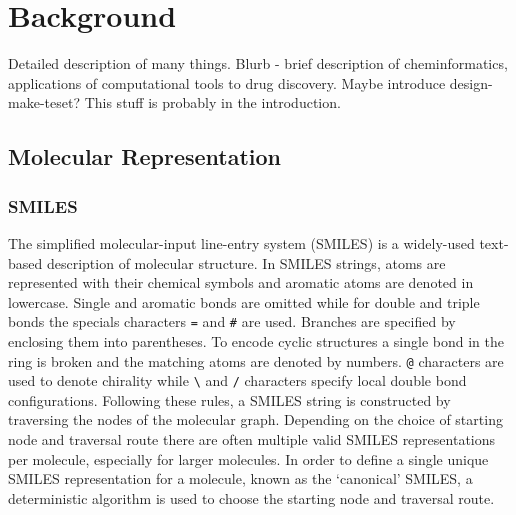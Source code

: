 \chapter{Background} \label{ch:background}

Detailed description of many things. Blurb - brief description of cheminformatics, applications of computational tools to drug discovery. Maybe introduce design-make-teset? This stuff is probably in the introduction.

\section{Molecular Representation}

\subsection{SMILES}
The simplified molecular-input line-entry system (SMILES) \cite{Weininger1988, Weininger1989} is a widely-used text-based description of molecular structure. In SMILES strings, atoms are represented with their chemical symbols and aromatic atoms are denoted in lowercase. Single and aromatic bonds are omitted while for double and triple bonds the specials characters \texttt{=} and \texttt{\#} are used. Branches are specified by enclosing them into parentheses. To encode cyclic structures a single bond in the ring is broken and the matching atoms are denoted by numbers. \texttt{@} characters are used to denote chirality while \texttt{\textbackslash} and \texttt{/} characters specify local double bond configurations. Following these rules, a SMILES string is constructed by traversing the nodes of the molecular graph. Depending on the choice of starting node and traversal route there are often multiple valid SMILES representations per molecule, especially for larger molecules. In order to define a single unique SMILES representation for a molecule, known as the `canonical' SMILES, a deterministic algorithm is used to choose the starting node and traversal route.

